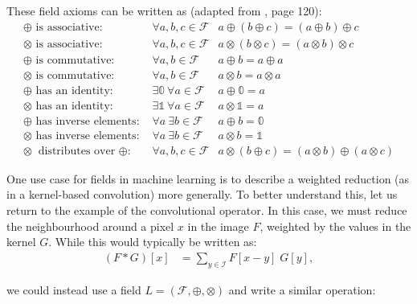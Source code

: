 \documentclass[a4paper, 12pt]{report}
\begin{document}
These field axioms can be written as (adapted from \cite{beachy2006abstract}, page 120):
\begin{align}
\textrm{$\oplus$ is associative: }&\forall a,b,c\in \mathcal{F} &  a \oplus (b \oplus c) = (a\oplus b) \oplus c \\ 
\textrm{$\otimes$ is associative: }&\forall a,b,c\in \mathcal{F} &  a \otimes (b \otimes c) = (a\otimes b) \otimes c \\ 
\textrm{$\oplus$ is commutative: }&\forall a,b\in \mathcal{F} & a\oplus b = a  \oplus a \\
\textrm{$\otimes$ is commutative: }&\forall a,b\in \mathcal{F} & a\otimes b = a  \otimes a \\
\oplus\textrm{ has an identity: }& \exists \mathbb{0} ~\forall a\in \mathcal{F} & a\oplus \mathbb{0} = a \\ 
\otimes\textrm{ has an identity: }& \exists \mathbb{1} ~\forall a\in \mathcal{F} & a\otimes \mathbb{1} = a \\ 
\oplus\textrm{ has inverse elements: }& \forall a~\exists b\in \mathcal{F} & a\oplus b = \mathbb{0} \label{eq:additive-inverse}  \\ 
\otimes\textrm{ has inverse elements: }& \forall a~\exists b\in \mathcal{F} & a\otimes b = \mathbb{1}  \\ 
\otimes \textrm{ distributes over $\oplus$: }&\forall a,b,c\in \mathcal{F} & a\otimes (b \oplus c) = (a\otimes b)\oplus(a\otimes c)
\end{align}

One use case for fields in machine learning is to describe a weighted reduction (as in a kernel-based convolution) more generally. To better understand this, let us return to the example of the convolutional operator. In this case, we must reduce the neighbourhood around a pixel $x$ in the image $F$, weighted by the values in the kernel $G$. While this would typically be written as:
\begin{align}
	(F*G)[x] &= \sum_{y\in\mathcal{I}} F[x-y]\; G[y],
\end{align}

\noindent
we could instead use a field $L=(\mathcal{F}, \oplus, \otimes)$ and write a similar operation:
\end{document}
